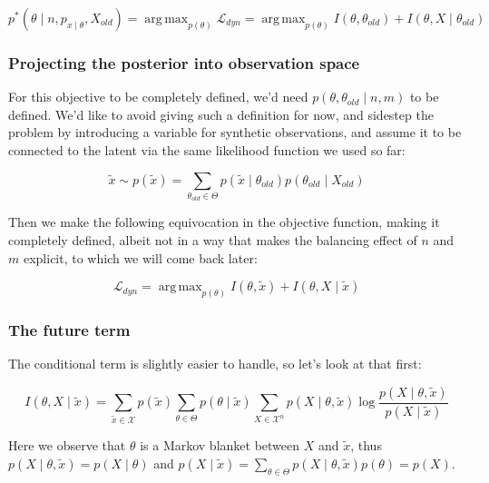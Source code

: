 \documentclass{article}
\DeclareMathOperator*{\argmax}{arg\,max}
\begin{document}
\begin{equation}
    p^*(\theta \mid n, p_{x \mid \theta}, X_{old}) = \argmax_{p(\theta)} \mathcal{L}_{dyn} = \argmax_{p(\theta)} I(\theta, \theta_{old}) + I(\theta, X \mid \theta_{old})
\end{equation}

\subsubsection{Projecting the posterior into observation space}

For this objective to be completely defined, we'd need $p(\theta, \theta_{old} \mid n, m)$ to be defined. We'd like to avoid giving such a definition for now, and sidestep the problem by introducing a variable for synthetic observations, and assume it to be connected to the latent via the same likelihood function we used so far:

\begin{equation}
    \tilde{x} \sim p(\tilde{x}) = \sum_{\theta_{old} \in \Theta} p(\tilde{x} \mid \theta_{old}) p(\theta_{old} \mid X_{old})
\end{equation}

Then we make the following equivocation in the objective function, making it completely defined, albeit not in a way that makes the balancing effect of $n$ and $m$ explicit, to which we will come back later:

\begin{equation}
    \mathcal{L}_{dyn} = \argmax_{p(\theta)} I(\theta, \tilde{x}) + I(\theta, X \mid \tilde{x})
\end{equation}

\subsubsection{The future term}

The conditional term is slightly easier to handle, so let's look at that first:

\begin{equation}
    I(\theta, X \mid \tilde{x}) = \sum_{\tilde{x} \in \mathcal{X}} p(\tilde{x}) \sum_{\theta \in \Theta} p(\theta \mid \tilde{x}) \sum_{X \in \mathcal{X}^n} p(X \mid \theta, \tilde{x}) \log \frac{p(X \mid \theta, \tilde{x})}{p(X \mid \tilde{x})}
\end{equation}

Here we observe that $\theta$ is a Markov blanket between $X$ and $\tilde{x}$, thus $p(X \mid \theta, \tilde{x}) = p(X \mid \theta)$ and $p(X \mid \tilde{x}) = \sum_{\theta \in \Theta} p(X \mid \theta, \tilde{x}) p(\theta) = p(X)$.
\end{document}
